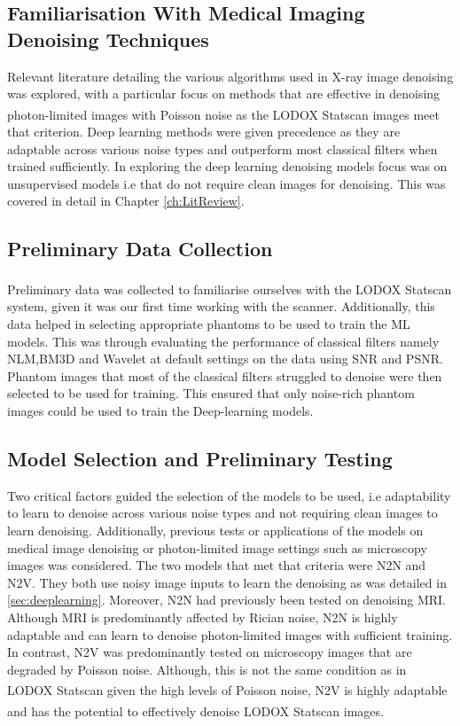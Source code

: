 \subsection{Familiarisation With Medical Imaging Denoising Techniques}
Relevant literature detailing the various algorithms used in X-ray image denoising was explored, with a particular focus on methods that are effective in denoising photon-limited images with Poisson noise as the LODOX\textsuperscript{\textregistered} Statscan\textsuperscript{\textregistered} images meet that criterion. Deep learning methods were given precedence as they are adaptable across various noise types and outperform most classical filters when trained sufficiently. In exploring the deep learning denoising models focus was on unsupervised models i.e that do not require clean images for denoising. This was covered in detail in Chapter \ref{ch:LitReview}. 

\subsection{Preliminary Data Collection}
Preliminary data was collected to familiarise ourselves with the LODOX\textsuperscript{\textregistered} Statscan\textsuperscript{\textregistered} system, given it was our first time working with the scanner. Additionally, this data helped in selecting appropriate phantoms to be used to train the ML models. This was through evaluating the performance of classical filters namely \gls{NLM},\gls{BM3D} and Wavelet at default settings on the data using \gls{SNR} and \gls{PSNR}.  Phantom images that most of the classical filters struggled to denoise were then selected to be used for training. This ensured that only noise-rich phantom images could be used to train the Deep-learning models.

\subsection{Model Selection and Preliminary Testing}
\label{sec:modsec}
Two critical factors guided the selection of the models to be used, i.e adaptability to learn to denoise across various noise types and not requiring clean images to learn denoising. Additionally, previous tests or applications of the models on medical image denoising or photon-limited image settings such as microscopy images was considered. The two models that met that criteria were \gls{N2N} and \gls{N2V}. They both use noisy image inputs to learn the denoising as was detailed in \ref{sec:deeplearning}. Moreover, \gls{N2N} had previously been tested on denoising \gls{MRI}. Although \gls{MRI} is predominantly affected by Rician noise, \gls{N2N} is highly adaptable and can learn to denoise photon-limited images with sufficient training. In contrast, \gls{N2V} was predominantly tested on microscopy images that are degraded by Poisson noise. Although, this is not the same condition as in LODOX\textsuperscript{\textregistered} Statscan\textsuperscript{\textregistered}
 given the high levels of Poisson noise, \gls{N2V} is highly adaptable and has the potential to effectively denoise LODOX\textsuperscript{\textregistered} Statscan\textsuperscript{\textregistered}
images. 

